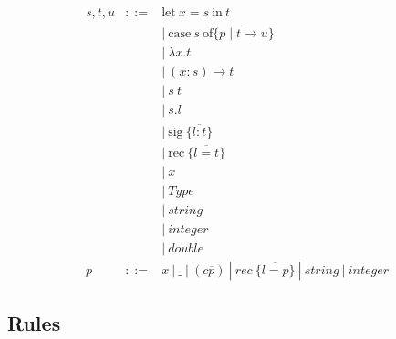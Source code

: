 \documentclass[a4paper,11pt]{article}
\begin{document}
\begin{eqnarray*}
s,t,u & ::= & \textrm{let} \ x = s \ \textrm{in} \ t  \\
& & | \ \textrm{case} \ s \ \textrm{of} \{ \overline{p \mid t \rightarrow u} \} \\
& & | \ \lambda x . t \\
& & | \ (x : s) \rightarrow t \\
& & | \ s \ t \\
& & | \ s.l \\
& & | \ \textrm{sig} \ \{ \overline{l : t} \} \\
& & | \ \textrm{rec} \ \{ \overline{l = t} \} \\
& & | \ x \\
& & | \ Type \\
& & | \ string \\
& & | \ integer \\
& & | \ double \\
p & ::= & x \ | \ \_ \ | \ (c \overline{p}) \ | \ rec \ \{ \overline{l = p} \} \ | \ string \ | \ integer 
\end{eqnarray*}



\subsection{Rules}
\end{document}
